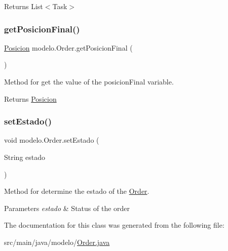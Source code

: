 \begin{DoxyReturn}{Returns}
List$<$\+Task$>$ 
\end{DoxyReturn}
\mbox{\label{classmodelo_1_1_order_a65b8d00aa11928a30bbe069540bb182f}} 
\subsubsection{\texorpdfstring{get\+Posicion\+Final()}{getPosicionFinal()}}
{\footnotesize\ttfamily \mbox{\hyperlink{classmodelo_1_1_posicion}{Posicion}} modelo.\+Order.\+get\+Posicion\+Final (\begin{DoxyParamCaption}{ }\end{DoxyParamCaption})}



Method for get the value of the posicion\+Final variable. 

\begin{DoxyReturn}{Returns}
\mbox{\hyperlink{classmodelo_1_1_posicion}{Posicion}} 
\end{DoxyReturn}
\mbox{\label{classmodelo_1_1_order_ae01e30a69b5efd08f428f08a75756ca6}} 
\subsubsection{\texorpdfstring{set\+Estado()}{setEstado()}}
{\footnotesize\ttfamily void modelo.\+Order.\+set\+Estado (\begin{DoxyParamCaption}\item[{String}]{estado }\end{DoxyParamCaption})}



Method for determine the estado of the \mbox{\hyperlink{classmodelo_1_1_order}{Order}}. 


\begin{DoxyParams}{Parameters}
{\em estado} & Status of the order \\
\hline
\end{DoxyParams}


The documentation for this class was generated from the following file\+:\begin{DoxyCompactItemize}
\item 
src/main/java/modelo/\mbox{\hyperlink{_order_8java}{Order.\+java}}\end{DoxyCompactItemize}
